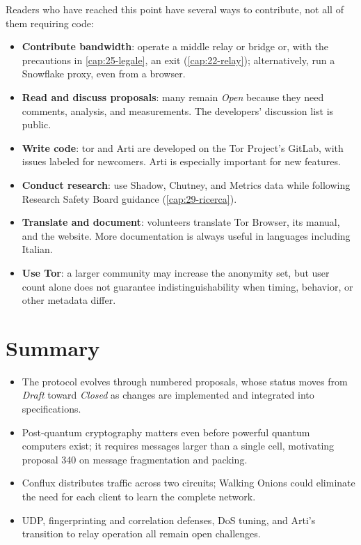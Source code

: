 Readers who have reached this point have several ways to contribute, not all of them requiring code:
\begin{itemize}
  \item \textbf{Contribute bandwidth}: operate a middle relay or bridge or, with the precautions in \cref{cap:25-legale}, an exit (\cref{cap:22-relay}); alternatively, run a Snowflake proxy, even from a browser.
  \item \textbf{Read and discuss proposals}: many remain \emph{Open} because they need comments, analysis, and measurements. The developers' discussion list is public.
  \item \textbf{Write code}: tor and Arti are developed on the Tor Project's GitLab, with issues labeled for newcomers. Arti is especially important for new features.
  \item \textbf{Conduct research}: use Shadow, Chutney, and Metrics data while following Research Safety Board guidance (\cref{cap:29-ricerca}).
  \item \textbf{Translate and document}: volunteers translate Tor Browser, its manual, and the website. More documentation is always useful in languages including Italian.
  \item \textbf{Use Tor}: a larger community may increase the anonymity set, but user count alone does not guarantee indistinguishability when timing, behavior, or other metadata differ.
\end{itemize}

\section*{Summary}
\begin{itemize}
  \item The protocol evolves through numbered proposals, whose status moves from \emph{Draft} toward \emph{Closed} as changes are implemented and integrated into specifications.
  \item Post-quantum cryptography matters even before powerful quantum computers exist; it requires messages larger than a single cell, motivating proposal 340 on message fragmentation and packing.
  \item Conflux distributes traffic across two circuits; Walking Onions could eliminate the need for each client to learn the complete network.
  \item UDP, fingerprinting and correlation defenses, DoS tuning, and Arti's transition to relay operation all remain open challenges.
\end{itemize}

